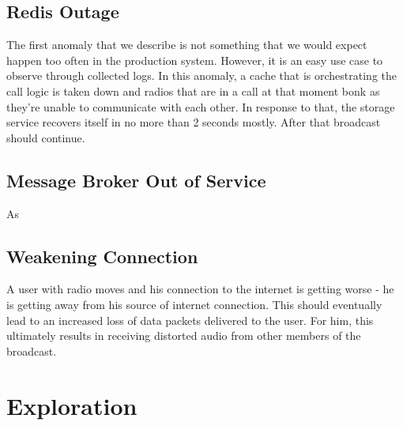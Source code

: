 \subsection{Redis Outage}
The first anomaly that we describe is not something that we would expect happen too often in the production system. 
However, it is an easy use case to observe through collected logs. 
In this anomaly, a cache that is orchestrating the call logic is taken down and radios that are in a call at that moment bonk as they're unable to communicate with each other.
In response to that, the storage service recovers itself in no more than 2 seconds mostly. After that broadcast should continue.


\subsection{Message Broker Out of Service}
As 

\subsection{Weakening Connection}
A user with radio moves and his connection to the internet is getting worse - he is getting away from his source of internet connection. This should eventually lead to an increased loss of data packets delivered to the user. For him, this ultimately results in receiving distorted audio from other members of the broadcast.



\section{Exploration}
